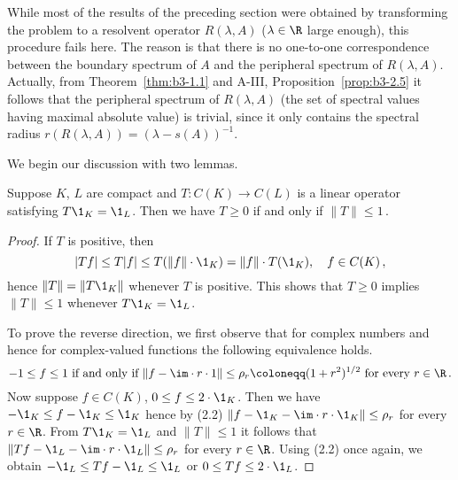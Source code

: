 While most of the results of the preceding section were obtained by transforming the problem to a resolvent operator $R(\lambda,A)$ ($\lambda \in \R$ large enough), this procedure fails here.
The reason is that there is no one-to-one correspondence between the boundary spectrum of $A$ and the peripheral spectrum of $R(\lambda,A)$.
Actually, from Theorem~\ref{thm:b3-1.1} and A-III, Proposition~\ref{prop:b3-2.5} it follows that the peripheral spectrum of $R(\lambda,A)$ (\ie the set of spectral values having maximal absolute value) is trivial, since it only contains the spectral radius $r(R(\lambda,A)) = (\lambda - s(A))^{-1}$.

We begin our discussion with two lemmas.

\begin{lemma}\label{lem:b3-2.1}
	Suppose $K$, $L$ are compact and $T \colon C(K) \to C(L)$ is a linear operator satisfying $T \1_{K} = \1_{L}$.
	Then we have $T \geq 0$ if and only if $\|T\| \leq 1$\,.
\end{lemma}
\begin{proof}
	If $T$ is positive, then
	\begin{equation}\label{eq:b3-2.1}
	|Tf| \leq T|f| \leq T(\|f\|\cdot \1_{K}) = \|f\|\cdot T(\1_{K}), \quad f \in C(K)\,,
	\end{equation}
	hence $\|T\| = \|T\1_{K}\|$ whenever $T$ is positive.
	This shows that $T \geq 0$ implies $\|T\| \leq 1$ whenever $T\1_{K} = \1_{L}$.
	
	To prove the reverse direction, we first observe that for complex numbers and hence for complex-valued functions the following equivalence holds.
	\begin{equation}\label{eq:b3-2.2}
	-1 \leq f \leq 1 \text{ if and only if } \|f - \im\cdot r\cdot 1\| \leq \rho_{r} \coloneqq (1+r^{2})^{1/2} \text{ for every } r \in \R\,.
	\end{equation}
	Now suppose $f \in C(K)$, $0 \leq f \leq 2\cdot \1_{K}$.
	Then we have $-\1_{K} \leq f - \1_{K} \leq \1_{K}$ hence by (2.2) $\|f - \1_{K} - \im\cdot r\cdot \1_{K}\| \leq \rho_{r}$ for every $r \in \R$.
	From $T\1_{K} = \1_{L}$ and $\|T\| \leq 1$ it follows that $\|Tf - \1_{L} - \im\cdot r\cdot \1_{L}\| \leq \rho_{r}$ for every $r \in \R$.
	Using (2.2) once again, we obtain $-\1_{L} \leq Tf - \1_{L} \leq \1_{L}$ or $0 \leq Tf \leq 2\cdot \1_{L}$.
\end{proof}
%		
